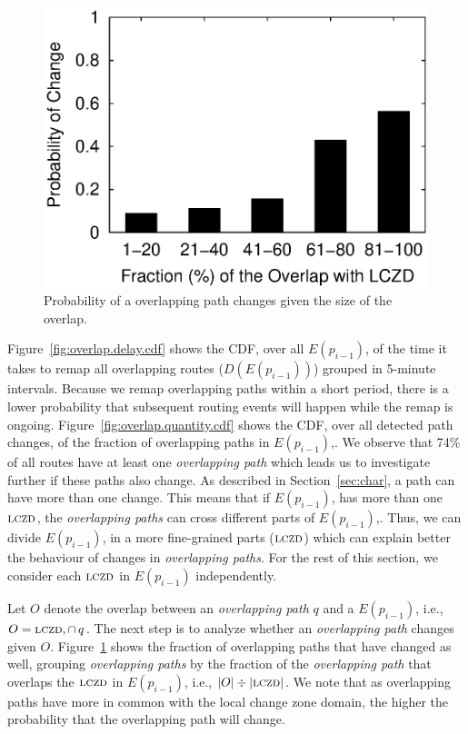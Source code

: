 \begin{figure}
\begin{minipage}{0.32\textwidth}
\includegraphics[width=1.05\columnwidth]{figs/patching/probchange/probchange.eps}
\caption{Probability of a overlapping path changes given the size of the overlap.}
\label{fig:overlap.change.prob}
\end{minipage}
\end{figure}


Figure~\ref{fig:overlap.delay.cdf} shows the CDF, over all $E(p_{i-1})$, 
of the time it takes to remap all
overlapping routes ($D(E(p_{i-1}))$) grouped in 5-minute intervals.  
Because we remap overlapping paths within
a short period, there is a lower probability that subsequent routing
events will happen while the remap is ongoing.
Figure~\ref{fig:overlap.quantity.cdf} shows the CDF, over all
detected path changes, of the fraction of overlapping paths in $E(p_{i-1})$,.  
We observe that 74\% of all routes have at least one 
\emph{overlapping path} which leads us to investigate further if these
paths also change.
As described in Section~\ref{sec:char}, a path can have more than one
change. This means that if $E(p_{i-1})$, has more than one $\mathrm{\textsc{lczd}}$, the \emph{overlapping
paths} can cross different parts of $E(p_{i-1})$,. Thus, we can divide $E(p_{i-1})$, in a more
fine-grained parts ($\mathrm{\textsc{lczd}}$) which can explain better the behaviour of changes in
\emph{overlapping paths}. For the rest of this section, we
consider each $\mathrm{\textsc{lczd}}$ in $E(p_{i-1})$ independently. 

Let $O$ denote the overlap between an \emph{overlapping path} $q$ and a 
$E(p_{i-1})$, i.e., $O = \mathrm{\textsc{lczd}},\cap\,q$. The next step 
is to analyze whether an \emph{overlapping path} changes given $O$.
Figure~\ref{fig:overlap.change.prob} shows
the fraction of overlapping paths that have changed as well, grouping
\emph{overlapping paths} by the fraction of the \emph{overlapping path}
that overlaps the $\mathrm{\textsc{lczd}}$ in $E(p_{i-1})$, i.e.,
$|O|\div|\mathrm{\textsc{lczd}}|$.  We note that as overlapping paths
have more in common with the local change zone domain, the higher
the probability that the overlapping path will change. 

